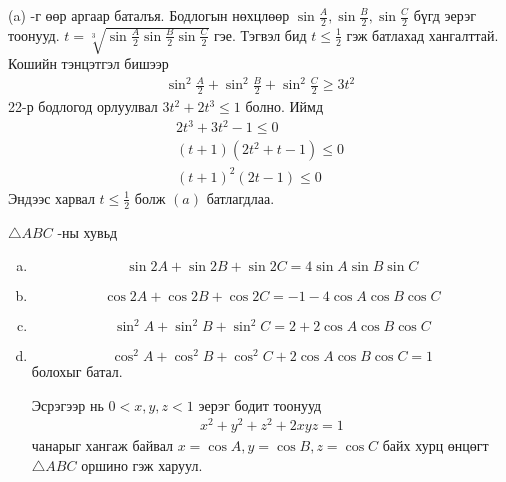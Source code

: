 \documentclass[10pt,a4paper,oneside]{book}
\begin{document}
\Note
(a) -г өөр аргаар баталъя. Бодлогын нөхцлөөр $\sin \frac{A}{2}, \sin \frac{B}{2}, \sin \frac{C}{2}$ бүгд эерэг тоонууд. $t=\sqrt[3]{\sin \frac{A}{2}\sin \frac{B}{2}\sin \frac{C}{2}}$ гэе. Тэгвэл бид $t \leq \frac{1}{2}$ гэж батлахад хангалттай. Кошийн тэнцэтгэл бишээр
\begin{align*}
\sin^2 \frac{A}{2} + \sin^2 \frac{B}{2} + \sin^2 \frac{C}{2} \geq 3t^2
\end{align*}
22-р бодлогод орлуулвал $3t^2 + 2t^3 \leq 1$ болно. Иймд
\begin{align*}
2t^3 + 3t^2 - 1 \leq 0\\
(t+1)(2t^2 + t -1) \leq 0\\
(t+1)^2(2t-1) \leq 0
\end{align*}
Эндээс харвал $t \leq \frac{1}{2}$ болж $(a)$ батлагдлаа.

\Problem
$\triangle ABC$ -ны хувьд
\begin{enumerate}[(a)]
\item
\begin{equation*}
\sin 2A + \sin 2B + \sin 2C = 4\sin A \sin B\sin C
\end{equation*}
\item
\begin{equation*}
\cos 2A + \cos 2B + \cos 2C = -1 - 4\cos A\cos B\cos C
\end{equation*}
\item
\begin{equation*}
\sin^2 A + \sin^2 B + \sin^2 C = 2+ 2\cos A \cos B \cos C
\end{equation*}
\item
\begin{equation*}
\cos^2 A + \cos^2 B + \cos^2 C + 2\cos A \cos B \cos C = 1
\end{equation*}
болохыг батал.

Эсрэгээр нь $0< x, y, z < 1$ эерэг бодит тоонууд
\begin{align*}
x^2 + y^2 + z^2 + 2xyz = 1
\end{align*} 
чанарыг хангаж байвал $x=\cos A, y= \cos B, z=\cos C$ байх хурц өнцөгт $\triangle ABC$ оршино гэж харуул.
\end{enumerate}
\end{document}
